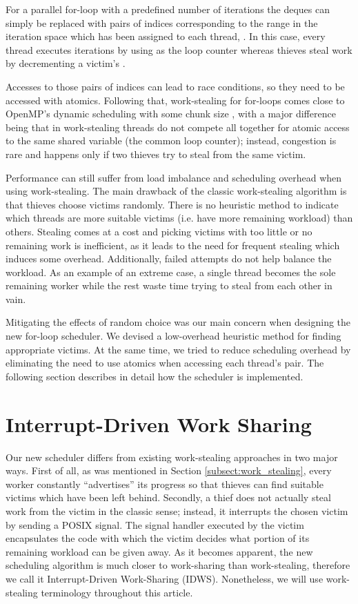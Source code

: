 \documentclass{acm_proc_article-sp}
\begin{document}
For a parallel for-loop with a predefined number of iterations  the deques 
can simply be replaced with pairs of indices  
corresponding to the range in the iteration space 
 which has been assigned to each thread, . In this case, every thread executes iterations by 
using  as the loop counter whereas thieves steal work by 
decrementing a victim's .

Accesses to those pairs of indices can lead to race conditions, so they need to 
be accessed with atomics. Following that, work-stealing for for-loops comes 
close to OpenMP's dynamic scheduling with some chunk size , with a major 
difference being that in work-stealing threads do not compete all together for 
atomic access to the same shared variable (the common loop counter); instead, 
congestion is rare and happens only if two thieves try to steal from the same 
victim.

Performance can still suffer from load imbalance and scheduling overhead when 
using work-stealing. The main drawback of the classic work-stealing algorithm 
is that thieves choose victims randomly. There is no heuristic method to 
indicate which threads are more suitable victims (i.e. have more remaining 
workload) than others. Stealing comes at a cost and picking victims with too 
little or no remaining work is inefficient, as it leads to the need for 
frequent stealing which induces some overhead. Additionally, failed attempts do 
not help balance the workload. As an example of an extreme case, a single 
thread becomes the sole remaining worker while the rest waste time trying to 
steal from each other in vain.

Mitigating the effects of random choice was our main concern when designing the 
new for-loop scheduler. We devised a low-overhead heuristic method for finding 
appropriate victims. At the same time, we tried to reduce scheduling overhead 
by eliminating the need to use atomics when accessing each thread's 
 pair. The following section describes in detail how the 
scheduler is implemented.


\section{Interrupt-Driven Work Sharing}
\label{sect:new_alg}
Our new scheduler differs from existing work-stealing approaches in two major 
ways. First of all, as was mentioned in Section \ref{subsect:work_stealing}, 
every worker constantly ``advertises'' its progress so that thieves can find 
suitable victims which have been left behind. Secondly, a thief does not 
actually steal work from the victim in the classic sense; instead, it 
interrupts the chosen victim by sending a POSIX signal. The signal handler 
executed by the victim encapsulates the code with which the victim decides what 
portion of its remaining workload can be given away. As it becomes apparent, 
the new scheduling algorithm is much closer to work-sharing than work-stealing, 
therefore we call it Interrupt-Driven Work-Sharing (IDWS). Nonetheless, we will 
use work-stealing terminology throughout this article.
\end{document}
